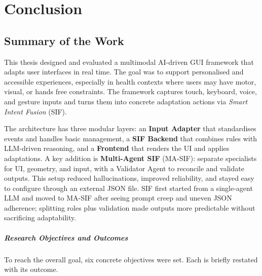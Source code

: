 \chapter{Conclusion}

\section{Summary of the Work}
This thesis designed and evaluated a multimodal AI-driven GUI framework that adapts user interfaces in real time. The goal was to support personalised and accessible experiences, especially in health contexts where users may have motor, visual, or hands free constraints. The framework captures touch, keyboard, voice, and gesture inputs and turns them into concrete adaptation actions via \emph{Smart Intent Fusion} (SIF).

The architecture has three modular layers: an \textbf{Input Adapter} that standardises events and handles basic management, a \textbf{SIF Backend} that combines rules with LLM-driven reasoning, and a \textbf{Frontend} that renders the UI and applies adaptations. A key addition is \textbf{Multi-Agent SIF} (MA-SIF): separate specialists for UI, geometry, and input, with a Validator Agent to reconcile and validate outputs. This setup reduced hallucinations, improved reliability, and stayed easy to configure through an external JSON file. SIF first started from a single-agent LLM and moved to MA-SIF after seeing prompt creep and uneven JSON adherence; splitting roles plus validation made outputs more predictable without sacrificing adaptability.

\paragraph{Research Objectives and Outcomes}
To reach the overall goal, six concrete objectives were set. Each is briefly restated with its outcome.

